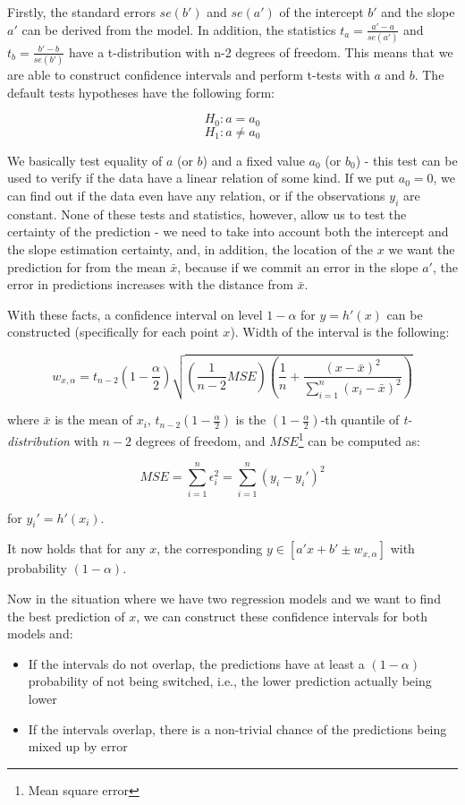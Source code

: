 Firstly, the standard errors $se(b')$ and $se(a')$ of the intercept $b'$ and the slope $a'$ can be derived from the model. In addition, the statistics $t_a = \frac{a' - a}{se(a')}$ and $t_b = \frac{b' - b}{se(b')}$ have a t-distribution with n-2 degrees of freedom. This means that we are able to construct confidence intervals and perform t-tests with $a$ and $b$. The default tests hypotheses have the following form:

\[H_0: a = a_0\]
\[H_1: a \neq a_0 \]

We basically test equality of $a$ (or $b$) and a fixed value $a_0$ (or $b_0$) - this test can be used to verify if the data have a linear relation of some kind. If we put $a_0 = 0$, we can find out if the data even have any relation, or if the observations $y_i$ are constant. None of these tests and statistics, however, allow us to test the certainty of the prediction - we need to take into account both the intercept and the slope estimation certainty, and, in addition, the location of the $x$ we want the prediction for from the mean $\bar{x}$, because if we commit an error in the slope $a'$, the error in predictions increases with the distance from $\bar{x}$. 

With these facts, a confidence interval on level $1 - \alpha$ for $y = h'(x)$ can be constructed (specifically for each point $x$). Width of the interval is the following:

\[
w_{x, \alpha} = t_{n - 2}(1-\frac{\alpha}{2}) \sqrt{(\frac{1}{n - 2} MSE) (\frac{1}{n} + \frac{(x - \bar{x})^2}{ \sum_{i = 1}^{n} (x_i - \bar{x})^2 })}
\]

where \(\bar{x}\) is the mean of \(x_i\), $t_{n - 2}(1-\frac{\alpha}{2})$ is the $(1-\frac{\alpha}{2})$-th quantile of \textit{t-distribution} with $n-2$ degrees of freedom, and $MSE$\footnote{Mean square error} can be computed as:

\[MSE =  \sum_{i = 1}^{n} \epsilon_i^2  =  \sum_{i = 1}^{n} (y_i - y_i')^2 \]

for \(y_i' = h'(x_i)\).

It now holds that for any $x$, the corresponding $y \in [a'x + b' \pm w_{x, \alpha}]$ with probability $(1-\alpha)$.

Now in the situation where we have two regression models and we want to find the best prediction of $x$, we can construct these confidence intervals for both models and:

\begin{itemize}
	\item If the intervals do not overlap, the predictions have at least a $(1 - \alpha)$ probability of not being switched, i.e., the lower prediction actually being lower
	\item If the intervals overlap, there is a non-trivial chance of the predictions being mixed up by error
\end{itemize}

